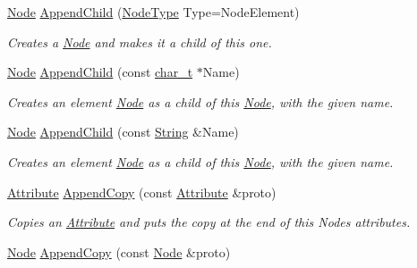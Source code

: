 \begin{DoxyCompactItemize}
\hyperlink{classMezzanine_1_1xml_1_1Node}{Node} \hyperlink{classMezzanine_1_1xml_1_1Node_aa9e1bc91805a3c47609988cc824ea54a}{AppendChild} (\hyperlink{namespaceMezzanine_1_1xml_a524d867e34ff408b8f45a51b7924cb80}{NodeType} Type=NodeElement)
\begin{DoxyCompactList}\small\item\em Creates a \hyperlink{classMezzanine_1_1xml_1_1Node}{Node} and makes it a child of this one. \item\end{DoxyCompactList}\item 
\hyperlink{classMezzanine_1_1xml_1_1Node}{Node} \hyperlink{classMezzanine_1_1xml_1_1Node_a982d4f4d515fd321d69ae400eb524d9c}{AppendChild} (const \hyperlink{namespaceMezzanine_1_1xml_a29b8a47c179e9895c4e9e66c45d1dbbc}{char\_\-t} $\ast$Name)
\begin{DoxyCompactList}\small\item\em Creates an element \hyperlink{classMezzanine_1_1xml_1_1Node}{Node} as a child of this \hyperlink{classMezzanine_1_1xml_1_1Node}{Node}, with the given name. \item\end{DoxyCompactList}\item 
\hyperlink{classMezzanine_1_1xml_1_1Node}{Node} \hyperlink{classMezzanine_1_1xml_1_1Node_a575b33a8912947de75d31643627cc435}{AppendChild} (const \hyperlink{namespaceMezzanine_1_1xml_a3ddf35656ecc38b6fa1d0364d9ad3b2c}{String} \&Name)
\begin{DoxyCompactList}\small\item\em Creates an element \hyperlink{classMezzanine_1_1xml_1_1Node}{Node} as a child of this \hyperlink{classMezzanine_1_1xml_1_1Node}{Node}, with the given name. \item\end{DoxyCompactList}\item 
\hyperlink{classMezzanine_1_1xml_1_1Attribute}{Attribute} \hyperlink{classMezzanine_1_1xml_1_1Node_a3b001ee40ef50c6b2d86161db96159a2}{AppendCopy} (const \hyperlink{classMezzanine_1_1xml_1_1Attribute}{Attribute} \&proto)
\begin{DoxyCompactList}\small\item\em Copies an \hyperlink{classMezzanine_1_1xml_1_1Attribute}{Attribute} and puts the copy at the end of this Nodes attributes. \item\end{DoxyCompactList}\item 
\hyperlink{classMezzanine_1_1xml_1_1Node}{Node} \hyperlink{classMezzanine_1_1xml_1_1Node_a324617ba5510dd345e87222d2264e1f3}{AppendCopy} (const \hyperlink{classMezzanine_1_1xml_1_1Node}{Node} \&proto)

\end{DoxyCompactItemize}
